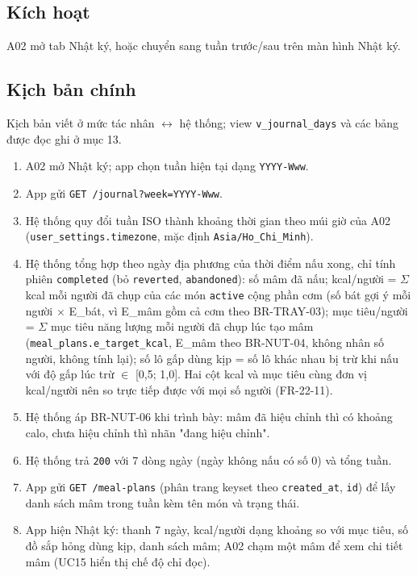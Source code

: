 \subsection{Kích hoạt}
A02 mở tab Nhật ký, hoặc chuyển sang tuần trước/\allowbreak{}sau trên màn hình Nhật ký.

\subsection{Kịch bản chính}
Kịch bản viết ở mức tác nhân \ensuremath{\leftrightarrow} hệ thống; view {\small\texttt{v\_\allowbreak{}\allowbreak{}journal\_\allowbreak{}\allowbreak{}days}} và các bảng được đọc ghi ở mục 13.

\begin{enumerate}
\item A02 mở Nhật ký; app chọn tuần hiện tại dạng {\small\texttt{YYYY-\allowbreak{}Www}}.
\item App gửi {\small\texttt{GET /\allowbreak{}\allowbreak{}journal?week=YYYY-\allowbreak{}Www}}.
\item Hệ thống quy đổi tuần ISO thành khoảng thời gian theo múi giờ của A02 ({\small\texttt{user\_\allowbreak{}\allowbreak{}settings.\allowbreak{}timezone}}, mặc định {\small\texttt{Asia/\allowbreak{}\allowbreak{}Ho\_\allowbreak{}\allowbreak{}Chi\_\allowbreak{}\allowbreak{}Minh}}).
\item Hệ thống tổng hợp theo ngày địa phương của thời điểm nấu xong, chỉ tính phiên {\small\texttt{completed}} (bỏ {\small\texttt{reverted}}, {\small\texttt{abandoned}}): số mâm đã nấu; kcal/\allowbreak{}người = \ensuremath{\Sigma} kcal mỗi người đã chụp của các món {\small\texttt{active}} cộng phần cơm (số bát gợi ý mỗi người \ensuremath{\times} E\_\allowbreak{}bát, vì E\_\allowbreak{}mâm gồm cả cơm theo BR-\allowbreak{}TRAY-\allowbreak{}03); mục tiêu/\allowbreak{}người = \ensuremath{\Sigma} mục tiêu năng lượng mỗi người đã chụp lúc tạo mâm ({\small\texttt{meal\_\allowbreak{}\allowbreak{}plans.\allowbreak{}e\_\allowbreak{}\allowbreak{}target\_\allowbreak{}\allowbreak{}kcal}}, E\_\allowbreak{}mâm theo BR-\allowbreak{}NUT-\allowbreak{}04, không nhân số người, không tính lại); số lô gấp dùng kịp = số lô khác nhau bị trừ khi nấu với độ gấp lúc trừ \ensuremath{\in} [0,5; 1,0]. Hai cột kcal và mục tiêu cùng đơn vị kcal/\allowbreak{}người nên so trực tiếp được với mọi số người (FR-\allowbreak{}22-\allowbreak{}11).
\item Hệ thống áp BR-\allowbreak{}NUT-\allowbreak{}06 khi trình bày: mâm đã hiệu chỉnh thì có khoảng calo, chưa hiệu chỉnh thì nhãn "đang hiệu chỉnh".
\item Hệ thống trả {\small\texttt{200}} với 7 dòng ngày (ngày không nấu có số 0) và tổng tuần.
\item App gửi {\small\texttt{GET /\allowbreak{}\allowbreak{}meal-\allowbreak{}plans}} (phân trang keyset theo {\small\texttt{created\_\allowbreak{}\allowbreak{}at}}, {\small\texttt{id}}) để lấy danh sách mâm trong tuần kèm tên món và trạng thái.
\item App hiện Nhật ký: thanh 7 ngày, kcal/\allowbreak{}người dạng khoảng so với mục tiêu, số đồ sắp hỏng dùng kịp, danh sách mâm; A02 chạm một mâm để xem chi tiết mâm (UC15 hiển thị chế độ chỉ đọc).
\end{enumerate}
